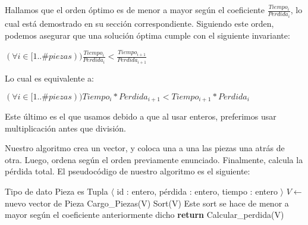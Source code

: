 Hallamos que el orden óptimo es de menor a mayor según el coeficiente $\frac{Tiempo_i}{Perdida_i}$, lo cual está demostrado en su sección correspondiente. Siguiendo este orden, podemos asegurar que una solución óptima cumple con el siguiente invariante:

\begin{center}

$(\forall i \in [1..\#{piezas})) \frac{Tiempo_i}{Perdida_i} < \frac{Tiempo_{i+1}}{Perdida_{i+1}}$
 
\end{center}

Lo cual es equivalente a:

\begin{center}

$(\forall i \in [1..\#{piezas})) Tiempo_i * Perdida_{i+1} < Tiempo_{i+1} * Perdida_i$
 
\end{center}

Este último es el que usamos debido a que al usar enteros, preferimos usar multiplicación antes que división.

Nuestro algoritmo crea un vector, y coloca una a una las piezas una atrás de otra. Luego, ordena según el orden previamente enunciado. Finalmente, calcula la pérdida total. El pseudocódigo de nuestro algoritmo es el siguiente:

\renewcommand{\algorithmiccomment}[1]{\hskip2em$//$ #1}

\begin{pseudo}
\State Tipo de dato Pieza es Tupla $\langle$ id : entero, pérdida : entero, tiempo : entero $\rangle$
        \State $V \leftarrow$ nuevo vector de Pieza %
        \State Cargo\_Piezas(V) %
        \State Sort(V) %
        \Comment Este sort se hace de menor a mayor según el coeficiente anteriormente dicho
        \State \textbf{return} Calcular\_perdida(V) %
    \EndProcedure
\end{pseudo}
